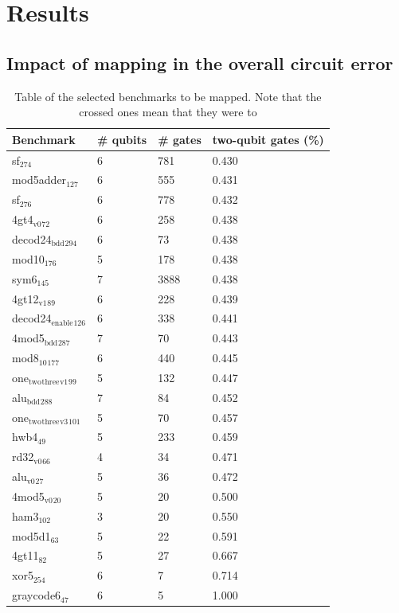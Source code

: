 
\chapter*{Results}
\label{sec:orgdc906dd}

\section*{Impact of mapping in the overall circuit error}
\label{sec:orga4d162e}

\begin{table}[htbp]
\caption{Table of the selected benchmarks to be mapped. Note that the crossed ones mean that they were to}
\centering
\small
\begin{tabular}{llll}
\hline
Benchmark & \# qubits & \# gates & two-qubit gates (\%)\\
\hline
sf\(_{\text{274}}\) & 6 & 781 & 0.430\\
mod5adder\(_{\text{127}}\) & 6 & 555 & 0.431\\
sf\(_{\text{276}}\) & 6 & 778 & 0.432\\
4gt4\(_{\text{v0}}\)\(_{\text{72}}\) & 6 & 258 & 0.438\\
decod24\(_{\text{bdd}}\)\(_{\text{294}}\) & 6 & 73 & 0.438\\
mod10\(_{\text{176}}\) & 5 & 178 & 0.438\\
sym6\(_{\text{145}}\) & 7 & 3888 & 0.438\\
4gt12\(_{\text{v1}}\)\(_{\text{89}}\) & 6 & 228 & 0.439\\
decod24\(_{\text{enable}}\)\(_{\text{126}}\) & 6 & 338 & 0.441\\
4mod5\(_{\text{bdd}}\)\(_{\text{287}}\) & 7 & 70 & 0.443\\
mod8\(_{\text{10}}\)\(_{\text{177}}\) & 6 & 440 & 0.445\\
one\(_{\text{two}}\)\(_{\text{three}}\)\(_{\text{v1}}\)\(_{\text{99}}\) & 5 & 132 & 0.447\\
alu\(_{\text{bdd}}\)\(_{\text{288}}\) & 7 & 84 & 0.452\\
one\(_{\text{two}}\)\(_{\text{three}}\)\(_{\text{v3}}\)\(_{\text{101}}\) & 5 & 70 & 0.457\\
hwb4\(_{\text{49}}\) & 5 & 233 & 0.459\\
rd32\(_{\text{v0}}\)\(_{\text{66}}\) & 4 & 34 & 0.471\\
alu\(_{\text{v0}}\)\(_{\text{27}}\) & 5 & 36 & 0.472\\
4mod5\(_{\text{v0}}\)\(_{\text{20}}\) & 5 & 20 & 0.500\\
ham3\(_{\text{102}}\) & 3 & 20 & 0.550\\
mod5d1\(_{\text{63}}\) & 5 & 22 & 0.591\\
4gt11\(_{\text{82}}\) & 5 & 27 & 0.667\\
xor5\(_{\text{254}}\) & 6 & 7 & 0.714\\
graycode6\(_{\text{47}}\) & 6 & 5 & 1.000\\
\hline
\end{tabular}
\end{table}

